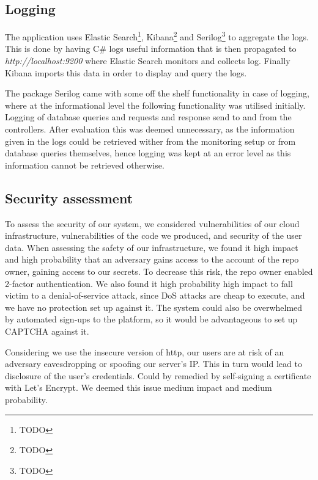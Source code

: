 \documentclass[report/main.tex]{subfiles}
\begin{document}
        \subsection{Logging}
            \label{SubSec:logging}
            The application uses Elastic Search\footnote{TODO}, Kibana\footnote{TODO} and Serilog\footnote{TODO} to aggregate the logs. This is done by having C# logs useful information that is then propagated to \textit{http://localhost:9200} where Elastic Search monitors and collects log. Finally Kibana imports this data in order to display and query the logs.
            
            The package Serilog came with some off the shelf functionality in case of logging, where at the informational level the following functionality was utilised initially. Logging of database queries and requests and response send to and from the controllers. After evaluation this was deemed unnecessary, as the information given in the logs could be retrieved wither from the monitoring setup or from database queries themselves, hence logging was kept at an error level as this information cannot be retrieved otherwise.

        \subsection{Security assessment}
        To assess the security of our system, we considered vulnerabilities of our cloud infrastructure, vulnerabilities of the code we produced, and security of the user data.
        When assessing the safety of our infrastructure, we found it high impact and high probability that an adversary gains access to the account of the repo owner, gaining access to our secrets. To decrease this risk, the repo owner enabled 2-factor authentication. We also found it high probability high impact to fall victim to a denial-of-service attack, since DoS attacks are cheap to execute, and we have no protection set up against it. The system could also be overwhelmed by automated sign-ups to the platform, so it would be advantageous to set up CAPTCHA against it.
        
        Considering we use the insecure version of http, our users are at risk of an adversary eavesdropping or spoofing our server's IP. This in turn would lead to disclosure of the user's credentials. Could by remedied by self-signing a certificate with Let's Encrypt. We deemed this issue medium impact and medium probability.
        
\end{document}

